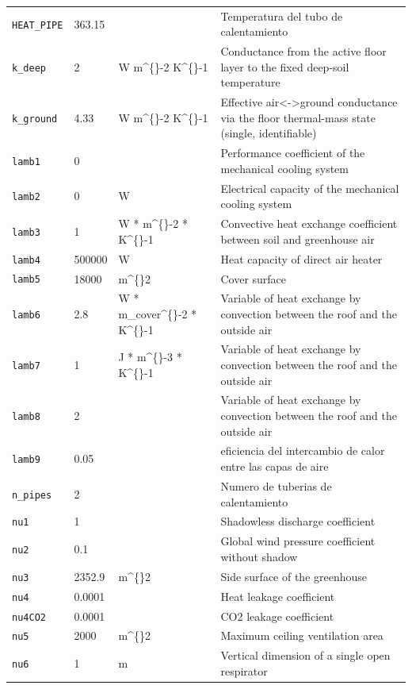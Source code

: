 \documentclass[11pt,a4paper]{article}
\begin{document}
\begin{longtable}{@{}p{} p{} p{} p{}@{}}
\texttt{HEAT\_PIPE} & 363.15 &  & Temperatura del tubo de calentamiento\\
\texttt{k\_deep} & 2 & W m\textasciicircum\{\}-2 K\textasciicircum\{\}-1 & Conductance from the active floor layer to the fixed deep-soil temperature\\
\texttt{k\_ground} & 4.33 & W m\textasciicircum\{\}-2 K\textasciicircum\{\}-1 & Effective air<->ground conductance via the floor thermal-mass state (single, identifiable)\\
\texttt{lamb1} & 0 &  & Performance coefficient of the mechanical cooling system\\
\texttt{lamb2} & 0 & W & Electrical capacity of the mechanical cooling system\\
\texttt{lamb3} & 1 & W * m\textasciicircum\{\}-2 * K\textasciicircum\{\}-1 & Convective heat exchange coefficient between soil and greenhouse air\\
\texttt{lamb4} & 500000 & W & Heat capacity of direct air heater\\
\texttt{lamb5} & 18000 & m\textasciicircum\{\}2 & Cover surface\\
\texttt{lamb6} & 2.8 & W * m\_cover\textasciicircum\{\}-2 * K\textasciicircum\{\}-1 & Variable of heat exchange by convection between the roof and the outside air\\
\texttt{lamb7} & 1 & J * m\textasciicircum\{\}-3 * K\textasciicircum\{\}-1 & Variable of heat exchange by convection between the roof and the outside air\\
\texttt{lamb8} & 2 &  & Variable of heat exchange by convection between the roof and the outside air\\
\texttt{lamb9} & 0.05 &  & eficiencia del intercambio de calor entre las capas de aire\\
\texttt{n\_pipes} & 2 &  & Numero de tuberias de calentamiento\\
\texttt{nu1} & 1 &  & Shadowless discharge coefficient\\
\texttt{nu2} & 0.1 &  & Global wind pressure coefficient without shadow\\
\texttt{nu3} & 2352.9 & m\textasciicircum\{\}2 & Side surface of the greenhouse\\
\texttt{nu4} & 0.0001 &  & Heat leakage coefficient\\
\texttt{nu4CO2} & 0.0001 &  & CO2 leakage coefficient\\
\texttt{nu5} & 2000 & m\textasciicircum\{\}2 & Maximum ceiling ventilation area\\
\texttt{nu6} & 1 & m & Vertical dimension of a single open respirator\\

\end{longtable}
\end{document}
